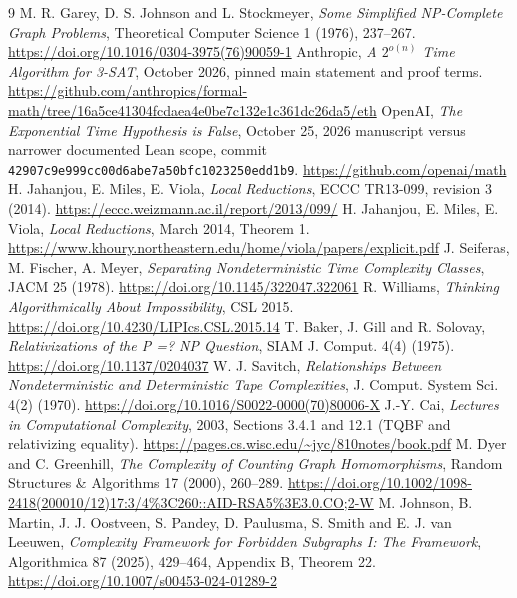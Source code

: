 \documentclass[11pt]{article}
\begin{document}
\begin{thebibliography}{9}
 M. R. Garey, D. S. Johnson and L. Stockmeyer,
\emph{Some Simplified NP-Complete Graph Problems},
Theoretical Computer Science 1 (1976), 237--267.
\url{https://doi.org/10.1016/0304-3975(76)90059-1}
 Anthropic, \emph{A $2^{o(n)}$ Time Algorithm for 3-SAT},
October 2026, pinned main statement and proof terms.
\url{https://github.com/anthropics/formal-math/tree/16a5ce41304fcdaea4e0be7c132e1c361dc26da5/eth}
 OpenAI, \emph{The Exponential Time Hypothesis is False},
October 25, 2026 manuscript versus narrower documented Lean scope,
commit \texttt{42907c9e999cc00d6abe7a50bfc1023250edd1b9}.
\url{https://github.com/openai/math}
 H. Jahanjou, E. Miles, E. Viola, \emph{Local Reductions},
ECCC TR13-099, revision 3 (2014).
\url{https://eccc.weizmann.ac.il/report/2013/099/}
 H. Jahanjou, E. Miles, E. Viola,
\emph{Local Reductions}, March 2014, Theorem 1.
\url{https://www.khoury.northeastern.edu/home/viola/papers/explicit.pdf}
 J. Seiferas, M. Fischer, A. Meyer,
\emph{Separating Nondeterministic Time Complexity Classes},
JACM 25 (1978).
\url{https://doi.org/10.1145/322047.322061}
 R. Williams,
\emph{Thinking Algorithmically About Impossibility}, CSL 2015.
\url{https://doi.org/10.4230/LIPIcs.CSL.2015.14}
 T. Baker, J. Gill and R. Solovay,
\emph{Relativizations of the P =? NP Question},
SIAM J. Comput. 4(4) (1975).
\url{https://doi.org/10.1137/0204037}
 W. J. Savitch,
\emph{Relationships Between Nondeterministic and Deterministic Tape Complexities},
J. Comput. System Sci. 4(2) (1970).
\url{https://doi.org/10.1016/S0022-0000(70)80006-X}
 J.-Y. Cai,
\emph{Lectures in Computational Complexity}, 2003,
Sections 3.4.1 and 12.1 (TQBF and relativizing equality).
\url{https://pages.cs.wisc.edu/~jyc/810notes/book.pdf}
 M. Dyer and C. Greenhill,
\emph{The Complexity of Counting Graph Homomorphisms},
Random Structures \& Algorithms 17 (2000), 260--289.
\url{https://doi.org/10.1002/1098-2418(200010/12)17:3/4%3C260::AID-RSA5%3E3.0.CO;2-W}
 M. Johnson, B. Martin, J. J. Oostveen,
S. Pandey, D. Paulusma, S. Smith and E. J. van Leeuwen,
\emph{Complexity Framework for Forbidden Subgraphs I: The Framework},
Algorithmica 87 (2025), 429--464, Appendix B, Theorem 22.
\url{https://doi.org/10.1007/s00453-024-01289-2}
\end{thebibliography}
\end{document}
